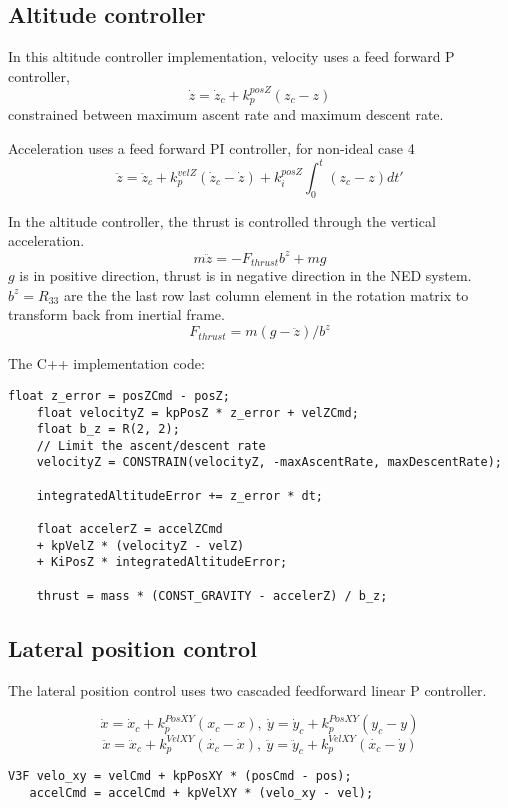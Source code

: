 \documentclass[letterpaper]{article}
\begin{document}
\subsection{Altitude controller} \label{control:altitude}

In this altitude controller implementation, velocity uses a feed forward P controller, 
$$\dot{z} = \dot{z}_c  + k_{p}^{posZ}(z_{c} - z) $$
constrained between maximum ascent rate and maximum descent rate.

Acceleration uses a feed forward PI controller, for non-ideal case 4
$$\ddot{z} = \ddot{z}_c + k_{p}^{velZ}(\dot{z}_{c} - \dot{z}) + k_i^{posZ}\int_0^t(z_{c} - z)dt'$$ 

In the altitude controller, the thrust is controlled through the vertical acceleration. 
$$ m \ddot{z} = - F_{thrust} b^z + m g$$
$g$ is in positive direction, thrust is in negative direction in the NED system. $b^z = R_{33}$ are the the last row last column element in the rotation matrix to transform back from inertial frame.
$$ F_{thrust} = m (g - \ddot{z})/b^z$$ 

The C++ implementation code:
\begin{lstlisting}[frame=single]
    float z_error = posZCmd - posZ;
    float velocityZ = kpPosZ * z_error + velZCmd;
    float b_z = R(2, 2);
    // Limit the ascent/descent rate
    velocityZ = CONSTRAIN(velocityZ, -maxAscentRate, maxDescentRate);
    
    integratedAltitudeError += z_error * dt;
    
    float accelerZ = accelZCmd
    + kpVelZ * (velocityZ - velZ)
    + KiPosZ * integratedAltitudeError;
    
    thrust = mass * (CONST_GRAVITY - accelerZ) / b_z;

\end{lstlisting}

\subsection{Lateral position control} \label{control:lateral}
The lateral position control uses two cascaded feedforward linear P controller.

$$\dot{x} = \dot{x}_c  + k_{p}^{PosXY}(x_{c} - x), \:
  \dot{y} = \dot{y}_c  + k_{p}^{PosXY}(y_{c} - y)$$
$$\ddot{x} = \ddot{x}_c  + k_{p}^{VelXY}(\dot{x_{c}} - \dot{x}), \:
  \ddot{y} = \ddot{y}_c  + k_{p}^{VelXY}(\dot{x_{c}} - \dot{y})$$


\begin{lstlisting}[frame=single]
   V3F velo_xy = velCmd + kpPosXY * (posCmd - pos);
   accelCmd = accelCmd + kpVelXY * (velo_xy - vel);
    
\end{lstlisting}
\end{document}
